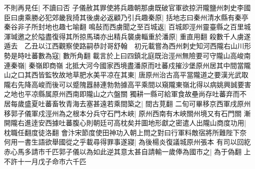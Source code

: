 不則再見任|{
	不讀曰否}
子儀赦其罪使將兵趣朝那虜既破官軍欲掠汧隴鹽州刺史李國臣曰虜乘勝必犯郊畿我掎其後虜必返顧乃引兵趣秦原|{
	括地志曰秦州清水縣有秦亭秦谷非子所封地也趣七喻翻}
鳴鼔而西虜聞之至百城返|{
	百城即涇州靈臺縣之百里城}
渾瑊邀之於隘盡復得其所掠馬璘亦出精兵襲虜輜重於潘原|{
	重直用翻}
殺數千人虜遂遁去　乙丑以江西觀察使路嗣恭討哥舒翰　初元載嘗為西州刺史知河西隴右山川形勢是時吐蕃數為寇|{
	數所角翻}
載言於上曰四鎮北庭既治涇州無險要可守隴山高峻南連秦嶺|{
	秦嶺即商嶺}
北抵大河今國家西境盡潘原而吐蕃戍摧沙堡原州居其中間當隴山之口其西皆監牧故地草肥水美平凉在其東|{
	唐原州治古高平當隴道之要漢光武取隴右先降高峻而後可以蹙隗囂赫連勃勃據高平乘間以窺隴東嶺北得以病姚興誠要害之地也平凉縣属原州西南即隴山之六盤關}
獨耕一縣可給軍食故壘尚存吐蕃弃而不居每歲盛夏吐蕃畜牧青海去塞甚遠若乘間築之|{
	間古莧翻}
二旬可畢移京西軍戌原州移郭子儀軍戍涇州為之根本分兵守石門木峽|{
	原州西南有木峽關州境又有石門關}
漸開隴右進逹安西據吐蕃腹心則朝廷可高枕矣并圖地形獻之密遣人出隴山商度功用|{
	枕職任翻度徒洛翻}
會汴宋節度使田神功入朝上問之對曰行軍料敵宿將所難陛下奈何用一書生語欲舉國從之乎載尋得罪事遂寢|{
	為後楊炎復議城原州張本}
有司以回紇赤心馬多請市千匹郭子儀以為如此逆其意太甚自請輸一歲俸為國市之|{
	為于偽翻}
上不許十一月戊子命市六千匹

